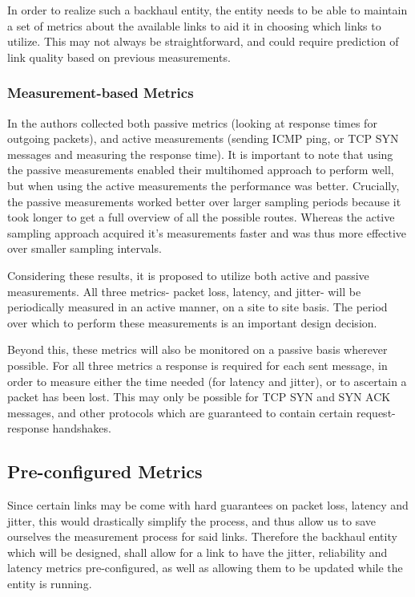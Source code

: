 In order to realize such a backhaul entity, the entity needs to be able to maintain a set of metrics about the available links to aid it in choosing which links to utilize. This may not always be straightforward, and could require prediction of link quality based on previous measurements.

\subsubsection{Measurement-based Metrics}

In \cite{akella2008performance} the authors collected both passive metrics (looking at response times for outgoing packets), and active measurements (sending ICMP ping, or TCP SYN messages and measuring the response time). It is important to note that using the passive measurements enabled their multihomed approach to perform well, but when using the active measurements the performance was better. Crucially, the passive measurements worked better over larger sampling periods because it took longer to get a full overview of all the possible routes. Whereas the active sampling approach acquired it's measurements faster and was thus more effective over smaller sampling intervals.

Considering these results, it is proposed to utilize both active and passive measurements. All three metrics- packet loss, latency, and jitter- will be periodically measured in an active manner, on a site to site basis. The period over which to perform these measurements is an important design decision.

Beyond this, these metrics will also be monitored on a passive basis wherever possible. For all three metrics a response is required for each sent message, in order to measure either the time needed (for latency and jitter), or to ascertain a packet has been lost. This may only be possible for TCP SYN and SYN ACK messages, and other protocols which are guaranteed to contain certain request-response handshakes.

\subsection{Pre-configured Metrics}

Since certain links may be come with hard guarantees on packet loss, latency and jitter, this would drastically simplify the process, and thus allow us to save ourselves the measurement process for said links. Therefore the backhaul entity which will be designed, shall allow for a link to have the jitter, reliability and latency metrics pre-configured, as well as allowing them to be updated while the entity is running.

